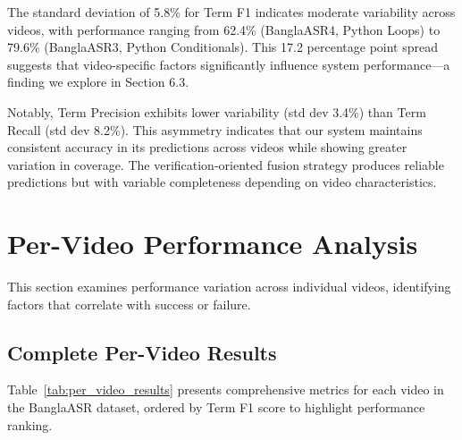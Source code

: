 The standard deviation of 5.8\% for Term F1 indicates moderate variability across videos, with performance ranging from 62.4\% (BanglaASR4, Python Loops) to 79.6\% (BanglaASR3, Python Conditionals). This 17.2 percentage point spread suggests that video-specific factors significantly influence system performance---a finding we explore in Section 6.3.

Notably, Term Precision exhibits lower variability (std dev 3.4\%) than Term Recall (std dev 8.2\%). This asymmetry indicates that our system maintains consistent accuracy in its predictions across videos while showing greater variation in coverage. The verification-oriented fusion strategy produces reliable predictions but with variable completeness depending on video characteristics.

\section{Per-Video Performance Analysis}

This section examines performance variation across individual videos, identifying factors that correlate with success or failure.

\subsection{Complete Per-Video Results}

Table~\ref{tab:per_video_results} presents comprehensive metrics for each video in the BanglaASR dataset, ordered by Term F1 score to highlight performance ranking.


